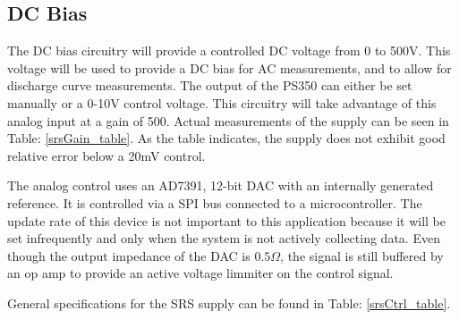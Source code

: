 \subsection {DC Bias}

The DC bias circuitry will provide a controlled DC voltage from 0 to 500V. This voltage will be used to provide a DC bias for AC measurements, and to allow for discharge curve measurements. The output of the PS350 can either be set manually or a 0-10V control voltage. This circuitry will take advantage of this analog input at a gain of 500. Actual measurements of the supply can be seen in Table: \ref{srsGain_table}. As the table indicates, the supply does not exhibit good relative error below a 20mV control. 



The analog control uses an AD7391, 12-bit DAC with an internally generated reference. It is controlled via a SPI bus connected to a microcontroller. The update rate of this device is not important to this application because it will be set infrequently and only when the system is not actively collecting data. Even though the output impedance of the DAC is $0.5\Omega$, the signal is still buffered by an op amp to provide an active voltage limmiter on the control signal.

General specifications for the SRS supply can be found in Table: \ref{srsCtrl_table}. 


